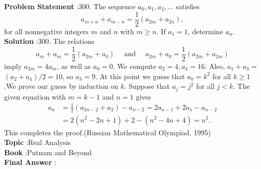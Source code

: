 \documentclass[10pt]{article}
\begin{document}
\textbf{Problem Statement} :300. The sequence $a_{0}, a_{1}, a_{2}, \ldots$ satisfies$$ a_{m+n}+a_{m-n}=\frac{1}{2}\left(a_{2 m}+a_{2 n}\right), $$for all nonnegative integers $m$ and $n$ with $m \geq n$. If $a_{1}=1$, determine $a_{n}$.\\
\textbf{Solution} :300. The relations$$ a_{m}+a_{m}=\frac{1}{2}\left(a_{2 m}+a_{0}\right) \quad \text { and } \quad a_{2 m}+a_{0}=\frac{1}{2}\left(a_{2 m}+a_{2 m}\right) $$imply $a_{2 m}=4 a_{m}$, as well as $a_{0}=0$. We compute $a_{2}=4, a_{4}=16$. Also, $a_{1}+a_{3}=$ $\left(a_{2}+a_{4}\right) / 2=10$, so $a_{3}=9$. At this point we guess that $a_{k}=k^{2}$ for all $k \geq 1$.We prove our guess by induction on $k$. Suppose that $a_{j}=j^{2}$ for all $j<k$. The given equation with $m=k-1$ and $n=1$ gives $$ \begin{aligned} a_{n} &=\frac{1}{2}\left(a_{2 n-2}+a_{2}\right)-a_{n-2}=2 a_{n-1}+2 a_{1}-a_{n-2} \\ &=2\left(n^{2}-2 n+1\right)+2-\left(n^{2}-4 n+4\right)=n^{2} . \end{aligned} $$This completes the proof.(Russian Mathematical Olympiad, 1995)\\
\textbf{Topic} :Real Analysis\\
\textbf{Book} :Putnam and Beyond\\
\textbf{Final Answer} :\\
\end{document}
